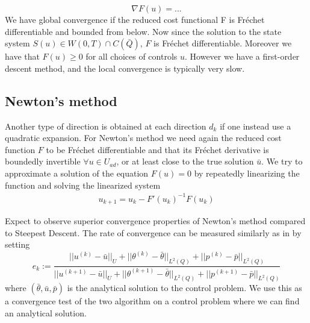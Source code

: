 \begin{equation*}
    \nabla F(u) = ...
\end{equation*}
We have global convergence if the reduced cost functional F is Fréchet differentiable and bounded from below. Now since the solution to the state system $S(u) \in W(0,T) \cap C(\bar{Q})$, $F$ is Fréchet differentiable. Moreover we have that $F(u) \geq 0$ for all choices of controls $u$. However we have a first-order descent method, and the local convergence is typically very slow. 

\subsection{Newton's method}
Another type of direction is obtained at each direction $d_k$ if one instead use a quadratic expansion. For Newton's method we need again the reduced cost function $F$ to be Fréchet differentiable and that its Fréchet derivative is boundedly invertible $\forall u \in U_{ad}$, or at least close to the true solution $\bar{u}$. We try to approximate a solution of the equation $F(u) = 0$ by repeatedly linearizing the function and solving the linearized system
\begin{align}
    \label{eq:Newton}
    u_{k+1} = u_k - F'(u_k)^{-1}F(u_k)
\end{align}


Expect to observe superior convergence properties of Newton's method compared to Steepest Descent. The rate of convergence can be measured similarly as in \cite{DPSteel} by setting 
\begin{equation}
    \label{eq:rate_of_conv}
    e_k := \frac{||u^{(k)}-\bar{u}||_U + ||\theta^{(k)}-\bar{\theta}||_{L^2(Q)} +||p^{(k)}-\bar{p}||_{L^2(Q)} }{||u^{(k+1)}-\bar{u}||_U + ||\theta^{(k+1)}-\bar{\theta}||_{L^2(Q)} +||p^{(k+1)}-\bar{p}||_{L^2(Q)}}
\end{equation}
where $(\bar{\theta},\bar{u},\bar{p})$ is the analytical solution to the control problem. We use this as a convergence test of the two algorithm on a control problem where we can find an analytical solution. 


